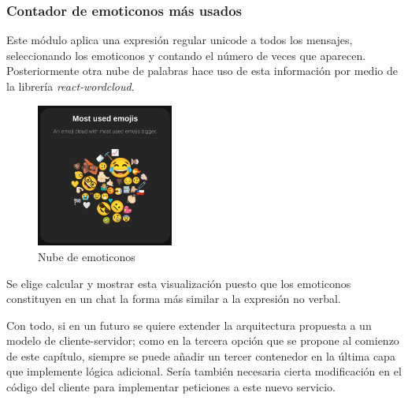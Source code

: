 
\subsubsection{Contador de emoticonos más usados}

Este módulo aplica una expresión regular unicode a todos los mensajes, seleccionando los emoticonos y contando el número de veces que aparecen. Posteriormente otra nube de palabras hace uso de esta información por medio de la librería \textit{react-wordcloud}.

\begin{figure}[H]
	\centering
	\includegraphics[width=0.4\textwidth]{img/emoji_cloud.png}
	\caption{Nube de emoticonos}
	\label{fig:chap4:emoji_cloud}
\end{figure}

Se elige calcular y mostrar esta visualización puesto que los emoticonos constituyen en un chat la forma más similar a la expresión no verbal.

\vspace{8mm}


Con todo, si en un futuro se quiere extender la arquitectura propuesta a un modelo de cliente-servidor; como en la tercera opción que se propone al comienzo de este capítulo, siempre se puede añadir un tercer contenedor en la última capa que implemente lógica adicional. Sería también necesaria cierta modificación en el código del cliente para implementar peticiones a este nuevo servicio.


\newpage
